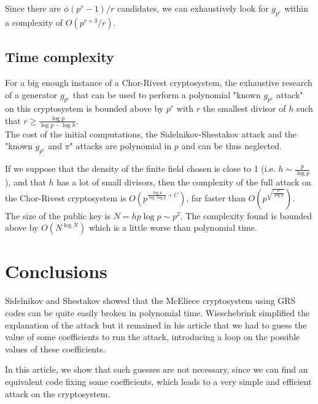 \documentclass[a4paper]{article}
\begin{document}
Since there are $\phi(p^r-1)/r$ candidates, we can exhaustively look for $g_{p^r}$ within a complexity of $O(p^{r+3} / r)$.


\subsection{Time complexity}

For a big enough instance of a Chor-Rivest cryptosystem, the exhaustive research of a generator $g_{p^r}$ that can be used to perform a polynomial "known $g_{p^r}$ attack" on this cryptosystem is bounded above by $p^r$ with $r$ the smallest divisor of $h$ such that $r \geq \frac{\log p}{\log p - \log h}$.\\

The cost of the initial computations, the Sidelnikov-Shestakov attack and the "known $g_{p^r}$ and $\pi$" attacks are polynomial in $p$ and can be thus neglected.

If we suppose that the density of the finite field chosen is close to 1 (i.e. $h \sim \frac{p}{\log p}$), and that $h$ has a lot of small divisors, then the complexity of the full attack on the Chor-Rivest cryptosystem is $O\left( p^{\frac{\log p}{\log \log p} + C} \right)$, far faster than $O\left(p^{\sqrt{\frac{p}{\log p}}}\right)$.\\

The size of the public key is $N = hp\log p \sim p^2$. The complexity found is bounded above by $O\left(N^{\log N}\right)$ which is a little worse than polynomial time.




\newpage
\section{Conclusions}

Sidelnikov and Shestakov showed that the McEliece cryptosystem using GRS codes can be quite easily broken in polynomial time. Wieschebrink simplified the explanation of the attack but it remained in his article that we had to guess the value of some coefficients to run the attack, introducing a loop on the possible values of these coefficients.

In this article, we show that such guesses are not necessary, since we can find an equivalent code fixing some coefficients, which leads to a very simple and efficient attack on the cryptosystem.\\
\end{document}
